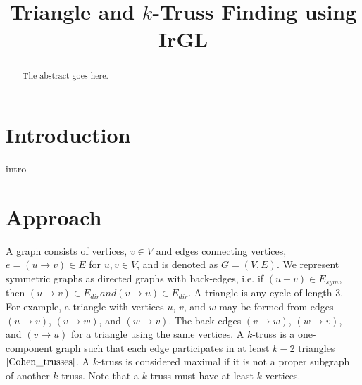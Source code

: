 \documentclass[conference]{IEEEtran}
\begin{document}
\title{Triangle and $k$-Truss Finding using IrGL}
\author{
\and
{}
\and
{}
\and
{}
}
\maketitle

\begin{abstract}
The abstract goes here.
\end{abstract}

\section{Introduction}
intro

\section{Approach}
A graph consists of vertices, $v \in V$ and edges connecting vertices, $e=(u \rightarrow v) \in E$ for $u, v \in V$, and is denoted as $G=(V,E)$. We represent symmetric graphs as directed graphs with back-edges, i.e. if $(u-v) \in E_{sym}$, then $(u \rightarrow v) \in E_{dir} and (v \rightarrow u) \in E_{dir}$.
A triangle is any cycle of length 3. For example, a triangle with vertices $u$, $v$, and $w$ may be formed from edges $(u \rightarrow v)$, $(v \rightarrow w)$, and $(w \rightarrow v)$. The back edges $(v \rightarrow w)$, $(w \rightarrow v)$, and $(v \rightarrow u)$ for a triangle using the same vertices.
A $k$-truss is a one-component graph such that each edge participates in at least $k-2$ triangles $\cite{Cohen_trusses}$. A $k$-truss is considered maximal if it is not a proper subgraph of another $k$-truss. Note that a $k$-truss must have at least $k$ vertices.
\end{document}
